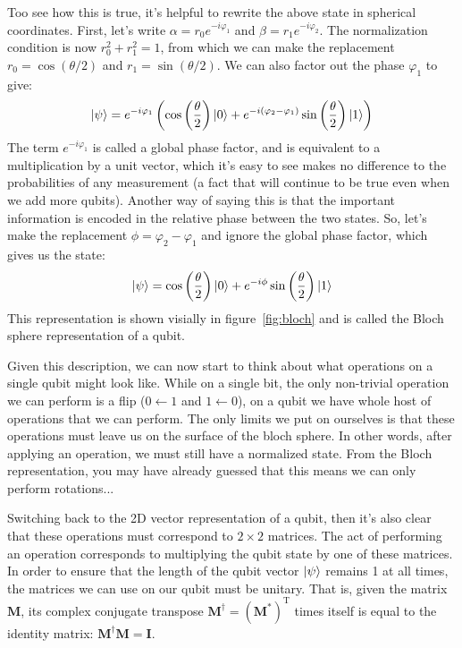Too see how this is true, it's helpful to rewrite the above state in spherical coordinates. First, let's
write $\alpha = r_0e^{-i\varphi_1}$ and $\beta = r_1e^{-i\varphi_2}$. The normalization condition is now
$r_0^2 + r_1^2 = 1$, from which we can make the replacement $r_0 = \cos(\theta/2)$ and $r_1 = \sin(\theta/2)$.
We can also factor out the phase $\varphi_1$ to give:
\begin{equation}
\ket{\psi} = e^{-i\varphi_1}\left(
    \cos\left(\frac{\theta}{2}\right)\ket{0} + e^{-i(\varphi_2 - \varphi_1)}\sin\left(\frac{\theta}{2}\right)\ket{1}
  \right)
\end{equation}
The term $e^{-i\varphi_1}$ is called a global phase factor, and is equivalent to a multiplication by a unit vector,
which it's easy to see makes no difference to the probabilities of any measurement (a fact that will continue to be 
true even when we add more qubits). Another way of saying this is that the important information is encoded in 
the relative phase between the two states. So, let's make the replacement $\phi = \varphi_2 - \varphi_1$ and ignore
the global phase factor, which gives us the state:
\begin{equation}
  \ket{\psi} = \cos\left(\frac{\theta}{2}\right)\ket{0} + e^{-i\phi}\sin\left(\frac{\theta}{2}\right)\ket{1}
\end{equation}
This representation is shown visially in figure~\ref{fig:bloch} and is called the Bloch sphere representation
of a qubit.

Given this description, we can now start to think about what operations on a single qubit might look like.
While on a single bit, the only non-trivial operation we can perform is a flip ($0 \leftarrow 1$ and $1 \leftarrow 0$),
on a qubit we have whole host of operations that we can perform. The only limits we put on ourselves is that these operations
must leave us on the surface of the bloch sphere. In other words, after applying an operation, we must still
have a normalized state. From the Bloch representation, you may have already guessed that this means we
can only perform rotations... 

Switching back to the 2D vector representation of a qubit, then it's also clear that these operations
must correspond to $2\times2$ matrices. The act of performing an operation corresponds to multiplying
the qubit state by one of these matrices. In order to ensure that the length of the qubit vector $\ket{\psi}$
remains 1 at all times, the matrices we can use on our qubit must be unitary. That is, given the matrix $\boldsymbol{M}$,
its complex conjugate transpose $\boldsymbol{M}^\dagger = (\boldsymbol{M^{*}})^\mathrm{T}$ times itself is equal to 
the identity matrix: $\boldsymbol{M}^\dagger\boldsymbol{M} = \boldsymbol{I}$.

